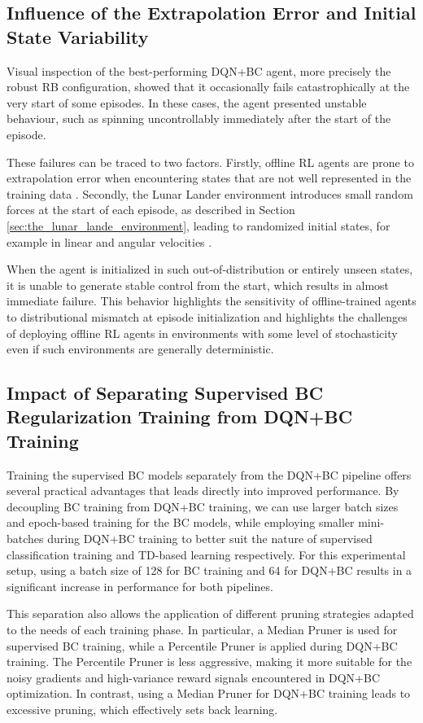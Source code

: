 \subsection{Influence of the Extrapolation Error and Initial State Variability}
Visual inspection of the best-performing DQN+BC agent, more precisely the robust RB configuration, showed that it occasionally fails catastrophically at the very start of some episodes. In these cases, the agent presented unstable behaviour, such as spinning uncontrollably immediately after the start of the episode.

These failures can be traced to two factors. Firstly, offline RL agents are prone to extrapolation error when encountering states that are not well represented in the training data \cite{lange2012batch}. Secondly, the Lunar Lander environment introduces small random forces at the start of each episode, as described in Section \ref{sec:the_lunar_lande_environment}, leading to randomized initial states, for example in linear and angular velocities \cite{LunarLanderEnv}.

When the agent is initialized in such out-of-distribution or entirely unseen states, it is unable to generate stable control from the start, which results in almost immediate failure. This behavior highlights the sensitivity of offline-trained agents to distributional mismatch at episode initialization and highlights the challenges of deploying offline RL agents in environments with some level of stochasticity even if such environments are generally deterministic.






\subsection{Impact of Separating Supervised BC Regularization Training from DQN+BC Training}
Training the supervised BC models separately from the DQN+BC pipeline offers several practical advantages that leads directly into improved performance. By decoupling BC training from DQN+BC training, we can use larger batch sizes and epoch-based training for the BC models, while employing smaller mini-batches during DQN+BC training to better suit the nature of supervised classification training and TD-based learning respectively. For this experimental setup, using a batch size of 128 for BC training and 64 for DQN+BC results in a significant increase in performance for both pipelines.

This separation also allows the application of different pruning strategies adapted to the needs of each training phase. In particular, a Median Pruner is used for supervised BC training, while a Percentile Pruner is applied during DQN+BC training. The Percentile Pruner is less aggressive, making it more suitable for the noisy gradients and high-variance reward signals encountered in DQN+BC optimization. In contrast, using a Median Pruner for DQN+BC training leads to excessive pruning, which effectively sets back learning.


